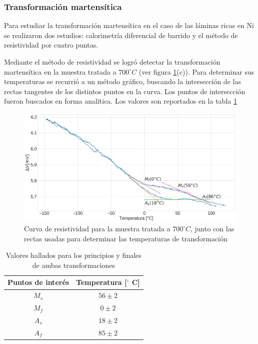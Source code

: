 \documentclass[12pt]{article}
\theoremstyle{definition}
\theoremstyle{remark}
\begin{document}
{\subsubsection{Transformación martensítica}
Para estudiar la transformación martensítica en el caso de las láminas ricas en Ni se realizaron dos estudios: calorimetría diferencial de barrido y el método de resistividad por cuatro puntas.

Mediante el método de resistividad se logró detectar la transformación martensítica en la muestra tratada a $700 ^\circ C$ (ver figura \ref{Res700}(c)). Para determinar sus temperaturas se recurrió a un método gráfico, buscando la intersección de las rectas tangentes de los distintos puntos en la curva. Los puntos de intersección fueron buscados en forma analítica. Los valores son reportados en la tabla \ref{TransformationPoints}

\begin{figure}[H]
 	\centering
	\includegraphics[scale=0.3]{img/Resistance_700.png}
 	\caption{Curva de resistividad para la muestra tratada a $700 ^\circ C$, junto con las rectas usadas para determinar las temperaturas de transformación}
	\label{Res700}
\end{figure}



\begin{table}[h]
\centering
\begin{tabular}{|c|c|}
\hline
Puntos de interés & Temperatura {[}$^\circ$ C{]} \\ \hline
$M_s$             & $56 \pm 2$                   \\ \hline
$M_f$             & $0 \pm 2$                    \\ \hline
$A_s$             & $18 \pm 2$                   \\ \hline
$A_f$             & $85 \pm 2$                   \\ \hline
\end{tabular}
\caption{Valores hallados para los principios y finales de ambas transformaciones}
\label{TransformationPoints}
\end{table}

}
\end{document}
